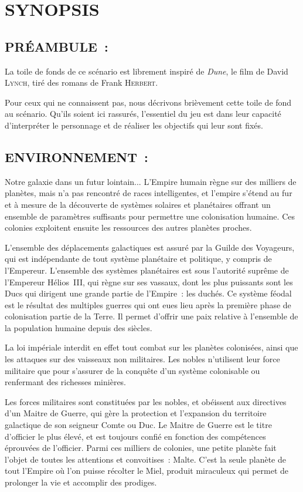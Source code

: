 \documentclass[14pt,twocolumn]{extarticle}
\begin{document}
\section{SYNOPSIS}

\subsection{PRÉAMBULE~:}

La toile de fonds de ce scénario est librement inspiré de \textit{Dune}, le
film de David \textsc{Lynch}, tiré des romans de Frank \textsc{Herbert}.

Pour ceux qui ne connaissent pas, nous décrivons brièvement cette toile de fond 
au scénario. Qu'ils soient ici rassurés, l'essentiel du jeu est dans leur
capacité d'interpréter le personnage et de réaliser les objectifs qui leur
sont fixés.

\subsection{ENVIRONNEMENT~:}

Notre galaxie dans un futur lointain... L'Empire humain règne sur des milliers
de planètes, mais n'a pas rencontré de races intelligentes, et l'empire s'étend
au fur et à mesure de la découverte de systèmes solaires et planétaires offrant
un ensemble de paramètres suffisants pour permettre une colonisation humaine.
Ces colonies exploitent ensuite les ressources des autres planètes proches.

L'ensemble des déplacements galactiques est assuré par la Guilde des Voyageurs,
qui est indépendante de tout système planétaire et politique, y compris de
l'Empereur. L'ensemble des systèmes planétaires est sous l'autorité suprême de
l'Empereur Hélios~III, qui règne sur ses vassaux, dont les plus puissants sont
les Ducs qui dirigent une grande partie de l'Empire~: les duchés. Ce système
féodal est le résultat des multiples guerres qui ont eues lieu après la
première phase de colonisation partie de la Terre. Il permet d'offrir une paix
relative à l'ensemble de la population humaine depuis des siècles.

La loi impériale interdit en effet tout combat sur les planètes colonisées,
ainsi que les attaques sur des vaisseaux non militaires. Les nobles n'utilisent
leur force militaire que pour s'assurer de la conquête d'un système colonisable
ou renfermant des richesses minières.

Les forces militaires sont constituées par les nobles, et obéissent aux
directives d'un Maitre de Guerre, qui gère la protection et l'expansion du
territoire galactique de son seigneur Comte ou Duc. Le Maitre de Guerre
est le titre d'officier le plus élevé, et est toujours confié en fonction des
compétences éprouvées de l'officier. Parmi ces milliers de colonies, une
petite planète fait l'objet de toutes les attentions et convoitises~: Malte.
C'est la seule planète de tout l'Empire où l'on puisse récolter le Miel,
produit miraculeux qui permet de prolonger la vie et accomplir des prodiges.
\end{document}
